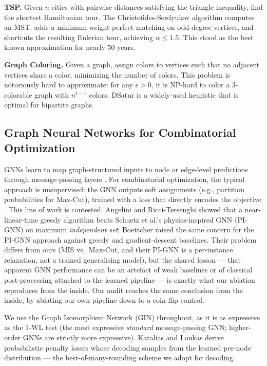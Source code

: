 \documentclass[11pt]{article}
\begin{document}
\textbf{TSP.} Given $n$ cities with pairwise distances satisfying the triangle inequality, find the shortest Hamiltonian tour.
The Christofides-Serdyukov algorithm \cite{christofides1976worst} computes an MST, adds a minimum-weight perfect matching on odd-degree vertices, and shortcuts the resulting Eulerian tour, achieving $\alpha \leq 1.5$.
This stood as the best known approximation for nearly 50 years.

\textbf{Graph Coloring.} Given a graph, assign colors to vertices such that no adjacent vertices share a color, minimizing the number of colors.
This problem is notoriously hard to approximate: for any $\epsilon > 0$, it is NP-hard to color a 3-colorable graph with $n^{1-\epsilon}$ colors.
DSatur \cite{brelaz1979new} is a widely-used heuristic that is optimal for bipartite graphs.

\subsection{Graph Neural Networks for Combinatorial Optimization}

GNNs learn to map graph-structured inputs to node or edge-level predictions through message-passing layers \cite{xu2019powerful}.
For combinatorial optimization, the typical approach is unsupervised: the GNN outputs soft assignments (e.g., partition probabilities for Max-Cut), trained with a loss that directly encodes the objective \cite{khalil2017learning, karalias2020erdos, schuetz2022combinatorial}.
This line of work is contested. Angelini and Ricci-Tersenghi \cite{angelini2023modern} showed that a near-linear-time greedy algorithm beats Schuetz et al.'s physics-inspired GNN (PI-GNN) \cite{schuetz2022combinatorial} on maximum \emph{independent set}; Boettcher \cite{boettcher2023inability} raised the same concern for the PI-GNN approach against greedy and gradient-descent baselines. Their problem differs from ours (MIS vs.\ Max-Cut, and their PI-GNN is a per-instance relaxation, not a trained generalising model), but the shared lesson --- that apparent GNN performance can be an artefact of weak baselines or of classical post-processing attached to the learned pipeline --- is exactly what our ablation reproduces from the inside.
Our audit reaches the same conclusion from the inside, by ablating our own pipeline down to a coin-flip control.

We use the Graph Isomorphism Network (GIN) \cite{xu2019powerful} throughout, as it is as expressive as the 1-WL test (the most expressive \emph{standard} message-passing GNN; higher-order GNNs are strictly more expressive).
Karalias and Loukas \cite{karalias2020erdos} derive probabilistic penalty losses whose decoding samples from the learned per-node distribution --- the best-of-many-rounding scheme we adopt for decoding.
\end{document}

